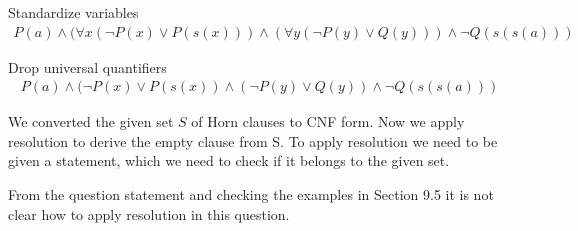 \documentclass[12pt,a4paper]{article}
\begin{document}
Standardize variables
\begin{align*}
    P(a) \land (\forall x(\neg P(x) \lor P(s(x))) \land (\forall y(\neg P(y) \lor Q(y))) \land \neg Q(s(s(a)))
\end{align*}

Drop universal quantifiers
\begin{align*}
    P(a) \land (\neg P(x) \lor P(s(x)) \land (\neg P(y) \lor Q(y)) \land \neg Q(s(s(a)))
\end{align*}

We converted the given set $S$ of Horn clauses to CNF form. Now we apply resolution to derive the empty clause from S. To apply resolution we need to be given a statement, which we need to check if it belongs to the given set.

From the question statement and checking the examples in Section 9.5 it is not clear how to apply resolution in this question.
\end{document}
